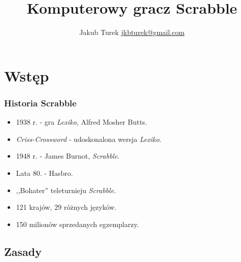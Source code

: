 \documentclass[10pt,a4paper]{beamer}
\author{\texorpdfstring{Jakub Turek \newline \href{mailto:jkbturek@gmail.com}{jkbturek@gmail.com}}{Jakub Turek}}
\title{Komputerowy gracz Scrabble}
\institute{Wydział Elektroniki i Technik Informacyjnych}
\begin{document}
\begin{frame}
	\titlepage
\end{frame}

\section{Wstęp}

\begin{frame}
	\frametitle{Historia Scrabble}
	
	\begin{itemize}
		\item 1938 r. - gra \emph{Lexiko}, Alfred Mosher Butts.
		\item \emph{Criss-Crossword} - udoskonalona wersja \emph{Lexiko}.
		\item 1948 r. - James Burnot, \emph{Scrabble}.
		\item Lata 80. - Hasbro.
		\item ,,Bohater'' teleturnieju \emph{Scrabble}.
		\item 121 krajów, 29 różnych języków.
		\item 150 milionów sprzedanych egzemplarzy.
	\end{itemize}
\end{frame}

\subsection{Zasady}
\end{document}

